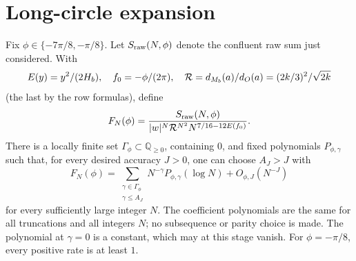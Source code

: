 \section{Long-circle expansion}\label{L:part3}

\begin{proposition}\label{L:prop:long-circle}
Fix $\phi\in\{-7\pi/8,-\pi/8\}$. Let \(S_{\rm raw}(N,\phi)\) denote the confluent raw sum just considered. With
\[
 E(y)=y^2/(2H_b),\quad f_0=-\phi/(2\pi),\quad
 {\cal R}=d_{M_b}(a)/d_O(a)=(2k/3)^2/\sqrt{2k}
\]
(the last by the row formulas), define
\[
 F_N(\phi)=
 \frac{S_{\rm raw}(N,\phi)}
 {|w|^N{\cal R}^{N^2}N^{7/16-12E(f_0)}}.
\]
There is a locally finite set \(\Gamma_\phi\subset\mathbb Q_{\ge0}\),
containing \(0\), and fixed polynomials \(P_{\phi,\gamma}\) such that,
for every desired accuracy \(J>0\), one can choose \(A_J>J\) with
\[
 F_N(\phi)=
 \sum_{\substack{\gamma\in\Gamma_\phi\\ \gamma\le A_J}}
 N^{-\gamma}P_{\phi,\gamma}(\log N)+O_{\phi,J}(N^{-J})
\]
for every sufficiently large integer \(N\). The coefficient polynomials
are the same for all truncations and all integers \(N\); no subsequence
or parity choice is made. The polynomial at \(\gamma=0\) is a constant,
which may at this stage vanish. For \(\phi=-\pi/8\), every positive rate
is at least \(1\).

\end{proposition}
